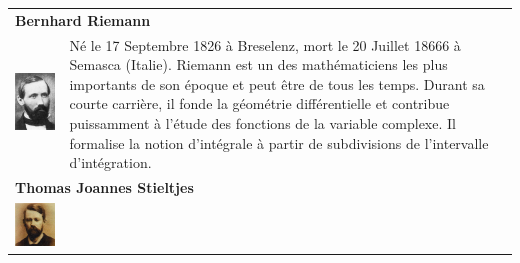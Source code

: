 \begin{tabular}{ll}
\multicolumn{2}{l}{\textbf{Bernhard Riemann}} \\[10pt]
\begin{minipage}{0.2\linewidth}
\includegraphics[scale=0.3]{images/Riemann.jpg}
\end{minipage}
&
\begin{minipage}{0.65\linewidth}
Né le  17 Septembre 1826 à Breselenz, mort le 20 Juillet 18666 à Semasca (Italie). Riemann est un des mathématiciens les plus importants de son époque et peut être de tous les temps. Durant sa courte carrière, il fonde la géométrie différentielle et contribue puissamment à l'étude des fonctions de la variable complexe. Il formalise la notion d'intégrale à partir de subdivisions de l'intervalle d'intégration.
\end{minipage}\\
\multicolumn{2}{l}{\textbf{Thomas Joannes Stieltjes}} \\[10pt]
\begin{minipage}{0.2\linewidth}
\includegraphics[scale=0.52]{images/Stieltjes.jpg}

\end{minipage}
\end{tabular}
